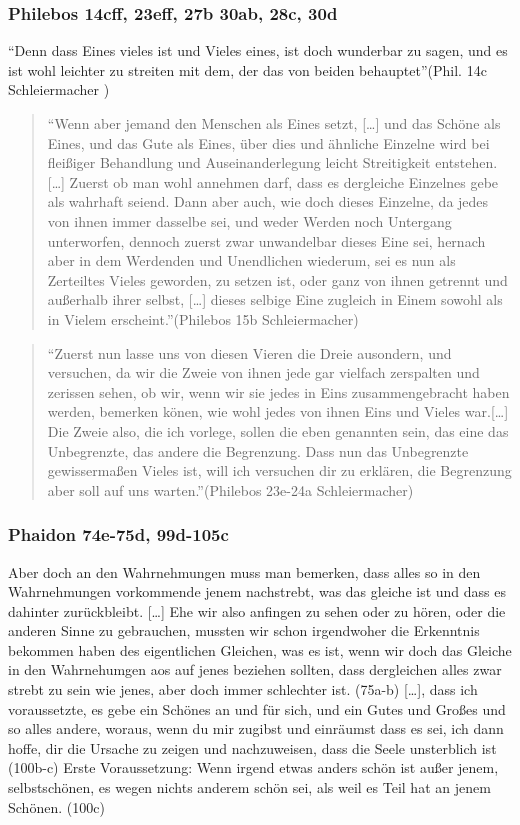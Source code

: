 \documentclass[12pt]{article}
\newcommand*{\zitatblock}[1]{%
    \begin{quote}
    \fontsize{10}{12}\selectfont
    \setlength{\parskip}{1.0em}
    #1
    \end{quote}
}
\begin{document}
\subsubsection{Philebos 14cff, 23eff, 27b 30ab, 28c, 30d}
\enquote{Denn dass Eines vieles ist und Vieles eines, ist doch wunderbar zu sagen, und es ist wohl leichter zu streiten mit dem, der das von beiden behauptet}(Phil. 14c Schleiermacher \nocite{PhilebosSchleiermacher})
\zitatblock{\enquote{Wenn aber jemand den Menschen als Eines setzt, [\dots] und das Schöne als Eines, und das Gute als Eines, über dies und ähnliche Einzelne wird bei fleißiger Behandlung und Auseinanderlegung leicht Streitigkeit entstehen.[\dots] Zuerst ob man wohl annehmen darf, dass es dergleiche Einzelnes gebe als wahrhaft seiend. Dann aber auch, wie doch dieses Einzelne, da jedes von ihnen immer dasselbe sei, und weder Werden noch Untergang unterworfen, dennoch zuerst zwar unwandelbar dieses Eine sei, hernach aber in dem Werdenden und Unendlichen wiederum, sei es nun als Zerteiltes Vieles geworden, zu setzen ist, oder ganz von ihnen getrennt und außerhalb ihrer selbst, [\dots] dieses selbige Eine zugleich in Einem sowohl als in Vielem erscheint.}(Philebos 15b Schleiermacher)}
\zitatblock{\enquote{Zuerst nun lasse uns von diesen Vieren die Dreie ausondern, und versuchen, da wir die Zweie von ihnen jede gar vielfach zerspalten und zerissen sehen, ob wir, wenn wir sie jedes in Eins zusammengebracht haben werden, bemerken könen, wie wohl jedes von ihnen Eins und Vieles war.[\dots] Die Zweie also, die ich vorlege, sollen die eben genannten sein, das eine das Unbegrenzte, das andere die Begrenzung. Dass nun das Unbegrenzte gewissermaßen Vieles ist, will ich versuchen dir zu erklären, die Begrenzung aber soll auf uns warten.}(Philebos 23e-24a Schleiermacher)}



\subsubsection{Phaidon 74e-75d, 99d-105c}
Aber doch an den Wahrnehmungen muss man bemerken, dass alles so in den Wahrnehmungen vorkommende jenem nachstrebt, was das gleiche ist und dass es dahinter zurückbleibt. [\dots] Ehe wir also anfingen zu sehen oder zu hören, oder die anderen Sinne zu gebrauchen, mussten wir schon irgendwoher die Erkenntnis bekommen haben des eigentlichen Gleichen, was es ist, wenn wir doch das Gleiche in den Wahrnehumgen aos auf jenes beziehen sollten, dass dergleichen alles zwar strebt zu sein wie jenes, aber doch immer schlechter ist. (75a-b) 
[\dots], dass ich voraussetzte, es gebe ein Schönes an und für sich, und ein Gutes und Großes und so alles andere, woraus, wenn du mir zugibst und einräumst dass es sei, ich dann hoffe, dir die Ursache zu zeigen und nachzuweisen, dass die Seele unsterblich ist (100b-c)
Erste Voraussetzung: Wenn irgend etwas anders schön ist außer jenem, selbstschönen, es wegen nichts anderem schön sei, als weil es Teil hat an jenem Schönen. (100c)
\end{document}
